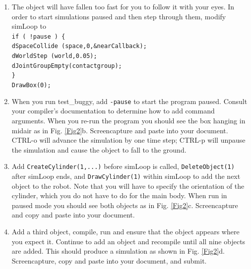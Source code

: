 \documentclass[12pt]{article}
\begin{document}
\begin{enumerate}
\item The object will have fallen too fast for you to follow it with your eyes. In order to start simulations paused and then step through them, modify simLoop to\\
\texttt{if ( !pause ) \{}\\
\texttt{dSpaceCollide (space,0,\&nearCallback);}\\
\texttt{dWorldStep (world,0.05);}\\
\texttt{dJointGroupEmpty(contactgroup);}\\
\texttt{\}}\\
\texttt{DrawBox(0);}\\

\item When you run test\_buggy, add \texttt{-pause} to start the program paused. Consult your compiler's documentation to determine how to add command arguments. When you re-run the program you should see the box hanging in midair as in Fig. \ref{Fig2}b. Screencapture and paste into your document. CTRL-o will advance the simulation by one time step; CTRL-p will unpause the simulation and cause the object to fall to the ground.

\item Add \texttt{CreateCylinder(1,...)} before simLoop is called, \texttt{DeleteObject(1)} after simLoop ends, and \texttt{DrawCylinder(1)} within simLoop to add the next object to the robot. Note that you will have to specify the orientation of the cylinder, which you do not have to do for the main body. When run in paused mode you should see both objects as in Fig. \ref{Fig2}c. Screencapture and copy and paste into your document.

\item Add a third object, compile, run and ensure that the object appears where you expect it. Continue to add an object and recompile until all nine objects are added. This should produce a simulation as shown in Fig. \ref{Fig2}d. Screencapture, copy and paste into your document, and submit.
\end{enumerate}
\end{document}
